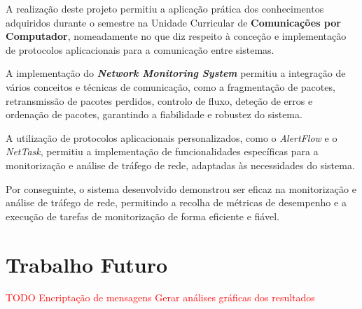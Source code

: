 \documentclass[a4paper,12pt]{scrreprt}
\begin{document}
A realização deste projeto permitiu a aplicação prática dos conhecimentos adquiridos
durante o semestre na Unidade Curricular de \textbf{Comunicações por Computador},
nomeadamente no que diz respeito à conceção e implementação de protocolos aplicacionais
para a comunicação entre sistemas. 

A implementação do \textbf{\textit{Network Monitoring System}} permitiu a integração de
vários conceitos e técnicas de comunicação, como a fragmentação de pacotes, retransmissão
de pacotes perdidos, controlo de fluxo, deteção de erros e ordenação de pacotes, garantindo
a fiabilidade e robustez do sistema.

A utilização de protocolos aplicacionais personalizados, como o \textit{AlertFlow} e o
\textit{NetTask}, permitiu a implementação de funcionalidades específicas para a
monitorização e análise de tráfego de rede, adaptadas às necessidades do sistema.


Por conseguinte, o sistema desenvolvido demonstrou ser eficaz na monitorização e
análise de tráfego de rede, permitindo a recolha de métricas de
desempenho e a execução de tarefas de monitorização de forma eficiente e fiável.

\section{Trabalho Futuro}

\textcolor{red}{
    TODO
    Encriptação de mensagens
    Gerar análises gráficas dos resultados
}



%
%
%
%
%
\end{document}
